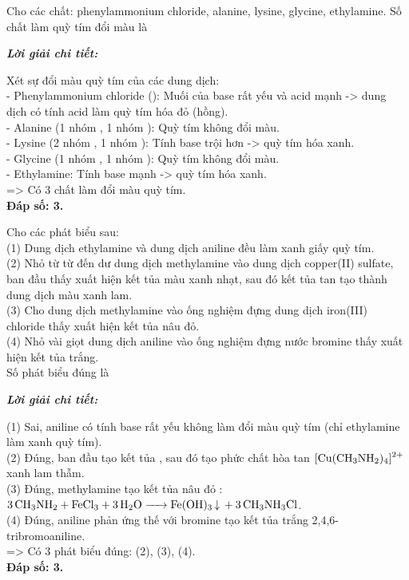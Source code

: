 \documentclass[11pt,a4paper]{article}
\def\loigiai#1{
\par\begingroup\color{blue!80!black}\small
\noindent\textbf{\textit{Lời giải chi tiết:}}\par
#1\par\endgroup}
\begin{document}
\begin{ex}
Cho các chất: phenylammonium chloride, alanine, lysine, glycine, ethylamine. Số chất làm quỳ tím đổi màu là
\loigiai{
Xét sự đổi màu quỳ tím của các dung dịch:\\
- Phenylammonium chloride (\ce{C6H5NH3Cl}): Muối của base rất yếu và acid mạnh -> dung dịch có tính acid làm quỳ tím hóa đỏ (hồng).\\
- Alanine (1 nhóm \ce{NH2}, 1 nhóm \ce{COOH}): Quỳ tím không đổi màu.\\
- Lysine (2 nhóm \ce{NH2}, 1 nhóm \ce{COOH}): Tính base trội hơn -> quỳ tím hóa xanh.\\
- Glycine (1 nhóm \ce{NH2}, 1 nhóm \ce{COOH}): Quỳ tím không đổi màu.\\
- Ethylamine: Tính base mạnh -> quỳ tím hóa xanh.\\
=> Có 3 chất làm đổi màu quỳ tím.\\
\textbf{Đáp số: 3.}}
\end{ex}


\begin{ex}
Cho các phát biểu sau:\\
(1) Dung dịch ethylamine và dung dịch aniline đều làm xanh giấy quỳ tím.\\
(2) Nhỏ từ từ đến dư dung dịch methylamine vào dung dịch copper(II) sulfate, ban đầu thấy xuất hiện kết tủa màu xanh nhạt, sau đó kết tủa tan tạo thành dung dịch màu xanh lam.\\
(3) Cho dung dịch methylamine vào ống nghiệm đựng dung dịch iron(III) chloride thấy xuất hiện kết tủa nâu đỏ.\\
(4) Nhỏ vài giọt dung dịch aniline vào ống nghiệm đựng nước bromine thấy xuất hiện kết tủa trắng.\\
Số phát biểu đúng là
\loigiai{
(1) Sai, aniline có tính base rất yếu không làm đổi màu quỳ tím (chỉ ethylamine làm xanh quỳ tím).\\
(2) Đúng, ban đầu tạo kết tủa \ce{Cu(OH)2}, sau đó tạo phức chất hòa tan $\ce{[Cu(CH3NH2)4]^2+}$ xanh lam thẫm.\\
(3) Đúng, methylamine tạo kết tủa nâu đỏ \ce{Fe(OH)3}: $\ce{3CH3NH2 + FeCl3 + 3H2O -> Fe(OH)3 v + 3CH3NH3Cl}$.\\
(4) Đúng, aniline phản ứng thế với bromine tạo kết tủa trắng 2,4,6-tribromoaniline.\\
=> Có 3 phát biểu đúng: (2), (3), (4).\\
\textbf{Đáp số: 3.}}
\end{ex}
\end{document}
